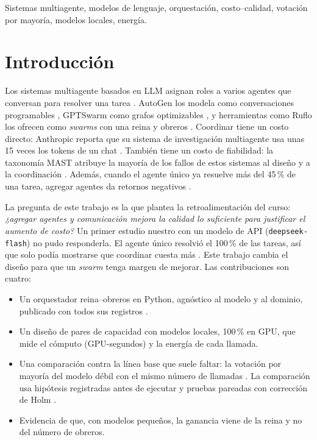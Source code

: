 \documentclass[conference]{IEEEtran}
\begin{document}
\begin{IEEEkeywords}
Sistemas multiagente, modelos de lenguaje, orquestación, costo--calidad, votación por mayoría, modelos locales, energía.
\end{IEEEkeywords}

\section{Introducción}

Los sistemas multiagente basados en LLM asignan roles a varios agentes que conversan para resolver una tarea \cite{guo2024survey}. AutoGen los modela como conversaciones programables \cite{wu2024autogen}, GPTSwarm como grafos optimizables \cite{zhuge2024gptswarm}, y herramientas como Ruflo los ofrecen como \textit{swarms} con una reina y obreros \cite{ruflo}. Coordinar tiene un costo directo: Anthropic reporta que su sistema de investigación multiagente usa unas 15 veces los tokens de un chat \cite{anthropic2025multiagent}. También tiene un costo de fiabilidad: la taxonomía MAST atribuye la mayoría de los fallos de estos sistemas al diseño y a la coordinación \cite{cemri2025mast}. Además, cuando el agente único ya resuelve más del 45\,\% de una tarea, agregar agentes da retornos negativos \cite{kim2025scaling}.

La pregunta de este trabajo es la que plantea la retroalimentación del curso: \emph{¿agregar agentes y comunicación mejora la calidad lo suficiente para justificar el aumento de costo?} Un primer estudio nuestro con un modelo de API (\texttt{deepseek-flash}) no pudo responderla. El agente único resolvió el 100\,\% de las tareas, así que solo podía mostrarse que coordinar cuesta más \cite{repo2026swarm}. Este trabajo cambia el diseño para que un \textit{swarm} tenga margen de mejorar. Las contribuciones son cuatro:
\begin{itemize}
\item Un orquestador reina--obreros en Python, agnóstico al modelo y al dominio, publicado con todos sus registros \cite{repo2026swarm}.
\item Un diseño de pares de capacidad con modelos locales, 100\,\% en GPU, que mide el cómputo (GPU-segundos) y la energía de cada llamada.
\item Una comparación contra la línea base que suele faltar: la votación por mayoría del modelo débil con el mismo número de llamadas \cite{wang2023selfconsistency,li2024moreagents}. La comparación usa hipótesis registradas antes de ejecutar y pruebas pareadas con corrección de Holm \cite{holm1979}.
\item Evidencia de que, con modelos pequeños, la ganancia viene de la reina y no del número de obreros.
\end{itemize}
\end{document}
